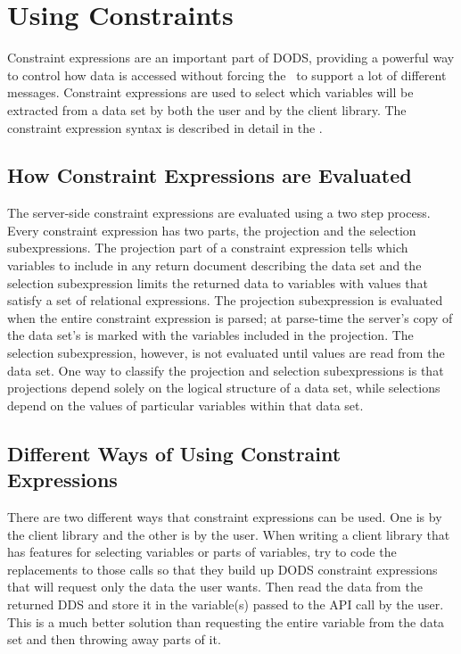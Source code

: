 \section{Using Constraints}
\label{tk,constraints}

Constraint expressions are an important part of DODS, providing a
powerful way to control how data is accessed without forcing the \Dap\ 
to support a lot of different messages. Constraint expressions are
used to select which variables will be extracted from a data set by
both the user and by the client library.  The constraint expression
syntax is described in detail in the \OPDuser.

\subsection{How Constraint Expressions are Evaluated}
\label{tk,ce-evaluation}

The server-side constraint expressions are evaluated using a two step
process. Every constraint expression has two parts, the projection and
the selection subexpressions. The projection part of a constraint
expression tells which variables to include in any return document
describing the data set and the selection subexpression limits the
returned data to variables with values that satisfy a set of
relational expressions.  The projection subexpression is evaluated
when the entire constraint expression is parsed; at parse-time the
server's copy of the data set's \class{DDS} is marked with the
variables included in the projection. The selection subexpression,
however, is not evaluated until values are read from the data set. One
way to classify the projection and selection subexpressions is that
projections depend solely on the logical structure of a data set,
while selections depend on the values of particular variables within
that data set.

\subsection{Different Ways of Using Constraint Expressions}
\label{tk,using-constraints}

There are two different ways that constraint expressions can be used.
One is by the client library and the other is by the user. When
writing a client library that has features for selecting variables or
parts of variables, try to code the replacements to those calls so
that they build up DODS constraint expressions that will request only
the data the user wants. Then read the data from the returned DDS and
store it in the variable(s) passed to the API call by the user. This
is a much better solution than requesting the entire variable from the
data set and then throwing away parts of it.

